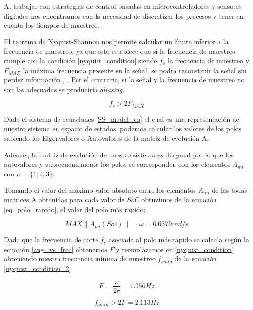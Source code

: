 \documentclass[10pt,a4paper]{article}
\begin{document}
Al trabajar con estrategias de control basadas en microcontroladores y sensores
digitales nos encontramos con la necesidad de discretizar los procesos y tener
en cuenta los tiempos de muestreo.

El teorema de Nyquist-Shannon nos permite calcular un límite inferior a la
frecuencia de muestreo, ya que este establece que si la frecuencia de muestreo
cumple con la condición \ref{nyquist_condition} siendo $f_s$ la frecuencia de
muestreo y $F_{MAX}$ la máxima frecuencia presente en la señal, se podrá
reconstruir la señal sin perder información \cite{Nyquist1928},
\cite{Shannon1949}.  Por el contrario, si la señal y la frecuencia de muestreo
no son las adecuadas se produciría \emph{aliasing}.

\begin{equation}
	f_s > 2 F_{MAX}
	\label{nyquist_condition}
\end{equation}

Dado el sistema de ecuaciones \ref{SS_model_eq} el cual es una representación de
nuestro sistema en espacio de estados, podemos calcular los valores de los polos
sabiendo los Eigenvalores o Autovalores de la matriz de evolución A.

Además, la matriz de evolución de nuestro sistema es diagonal por lo que los
autovalores y subsecuentemente los polos se corresponden con los elementos
$A_{nn}$ con $n=\{1;2;3\}$.

Tomando el valor del máximo valor absoluto entre los elementos $A_{nn}$ de las
todas matrices A obtenidas para cada valor de $SoC$ obtuvimos de la ecuación
\ref{eq_polo_rapido}, el valor del polo más rapido:

     \begin{equation}
     	MAX  \left \|A_{nn}(Soc)\right \| = \omega = 6.6379 rad/s
     	\label{eq_polo_rapido}
     \end{equation}

Dado que la frecuencia de corte $f_c$ asociada al polo más rapido se calcula
según la ecuación \ref{ang_vs_frec} obtenemos $F$ y reemplazamos en
\ref{nyquist_condition} obteniendo nuestra frecuencia mínima de muestreo
$f_{smin}$ de la ecuación \ref{nyquist_condition_2}.

\begin{equation}
	F = \frac{\omega}{2 \pi} = 1.056 Hz
	\label{ang_vs_frec}
\end{equation}

\begin{equation}
	f_{s min} > 2 F = 2.113 Hz
	\label{nyquist_condition_2}
\end{equation}
\end{document}

